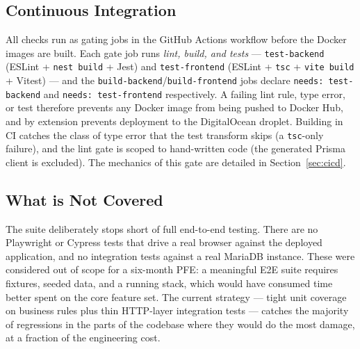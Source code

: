\documentclass[12pt, a4paper, oneside]{report}
\begin{document}
\subsection{Continuous Integration}

All checks run as gating jobs in the GitHub Actions workflow before
the Docker images are built. Each gate job runs \emph{lint, build, and
tests} --- \texttt{test-backend} (ESLint + \texttt{nest build} + Jest)
and \texttt{test-frontend} (ESLint + \texttt{tsc} + \texttt{vite build}
+ Vitest) --- and the \texttt{build-backend}/\texttt{build-frontend}
jobs declare \texttt{needs: test-backend} and
\texttt{needs: test-frontend} respectively. A failing lint rule, type
error, or test therefore prevents any Docker image from being pushed
to Docker Hub, and by extension prevents deployment to the
DigitalOcean droplet. Building in CI catches the class of type error
that the test transform skips (a \texttt{tsc}-only failure), and the
lint gate is scoped to hand-written code (the generated Prisma client
is excluded). The mechanics of this gate are detailed in
Section~\ref{sec:cicd}.

\subsection{What is Not Covered}

The suite deliberately stops short of full end-to-end testing. There
are no Playwright or Cypress tests that drive a real browser against
the deployed application, and no integration tests against a real
MariaDB instance. These were considered out of scope for a six-month
PFE: a meaningful E2E suite requires fixtures, seeded data, and a
running stack, which would have consumed time better spent on the
core feature set. The current strategy --- tight unit coverage on
business rules plus thin HTTP-layer integration tests --- catches the
majority of regressions in the parts of the codebase where they
would do the most damage, at a fraction of the engineering cost.
\end{document}
